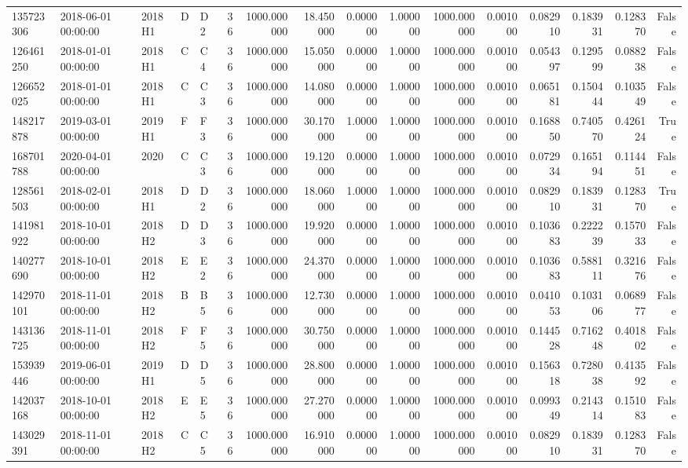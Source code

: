 \begin{tabular}{lllllrrrrrrrrrrr}
135723306 & 2018-06-01 00:00:00 & 2018H1 & D & D2 & 36 & 1000.000000 & 18.450000 & 0.000000 & 1.000000 & 1000.000000 & 0.001000 & 0.082910 & 0.183931 & 0.128370 & False \\
126461250 & 2018-01-01 00:00:00 & 2018H1 & C & C4 & 36 & 1000.000000 & 15.050000 & 0.000000 & 1.000000 & 1000.000000 & 0.001000 & 0.054397 & 0.129599 & 0.088238 & False \\
126652025 & 2018-01-01 00:00:00 & 2018H1 & C & C3 & 36 & 1000.000000 & 14.080000 & 0.000000 & 1.000000 & 1000.000000 & 0.001000 & 0.065181 & 0.150444 & 0.103549 & False \\
148217878 & 2019-03-01 00:00:00 & 2019H1 & F & F3 & 36 & 1000.000000 & 30.170000 & 1.000000 & 1.000000 & 1000.000000 & 0.001000 & 0.168850 & 0.740570 & 0.426124 & True \\
168701788 & 2020-04-01 00:00:00 & 2020 & C & C3 & 36 & 1000.000000 & 19.120000 & 0.000000 & 1.000000 & 1000.000000 & 0.001000 & 0.072934 & 0.165194 & 0.114451 & False \\
128561503 & 2018-02-01 00:00:00 & 2018H1 & D & D2 & 36 & 1000.000000 & 18.060000 & 1.000000 & 1.000000 & 1000.000000 & 0.001000 & 0.082910 & 0.183931 & 0.128370 & True \\
141981922 & 2018-10-01 00:00:00 & 2018H2 & D & D3 & 36 & 1000.000000 & 19.920000 & 0.000000 & 1.000000 & 1000.000000 & 0.001000 & 0.103683 & 0.222239 & 0.157033 & False \\
140277690 & 2018-10-01 00:00:00 & 2018H2 & E & E2 & 36 & 1000.000000 & 24.370000 & 0.000000 & 1.000000 & 1000.000000 & 0.001000 & 0.103683 & 0.588111 & 0.321676 & False \\
142970101 & 2018-11-01 00:00:00 & 2018H2 & B & B5 & 36 & 1000.000000 & 12.730000 & 0.000000 & 1.000000 & 1000.000000 & 0.001000 & 0.041053 & 0.103106 & 0.068977 & False \\
143136725 & 2018-11-01 00:00:00 & 2018H2 & F & F5 & 36 & 1000.000000 & 30.750000 & 0.000000 & 1.000000 & 1000.000000 & 0.001000 & 0.144528 & 0.716248 & 0.401802 & False \\
153939446 & 2019-06-01 00:00:00 & 2019H1 & D & D5 & 36 & 1000.000000 & 28.800000 & 0.000000 & 1.000000 & 1000.000000 & 0.001000 & 0.156318 & 0.728038 & 0.413592 & False \\
142037168 & 2018-10-01 00:00:00 & 2018H2 & E & E5 & 36 & 1000.000000 & 27.270000 & 0.000000 & 1.000000 & 1000.000000 & 0.001000 & 0.099349 & 0.214314 & 0.151083 & False \\
143029391 & 2018-11-01 00:00:00 & 2018H2 & C & C5 & 36 & 1000.000000 & 16.910000 & 0.000000 & 1.000000 & 1000.000000 & 0.001000 & 0.082910 & 0.183931 & 0.128370 & False \\

\end{tabular}
